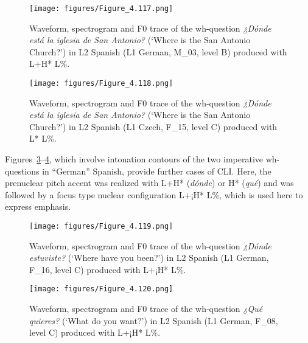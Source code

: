 \begin{figure}


\texttt{[image: figures/Figure\_4.117.png]}



\caption{Waveform, spectrogram and F0 trace of the wh-question \textit{¿Dónde está la iglesia de San Antonio?} (‘Where is the San Antonio Church?’) in L2 Spanish (L1 German, M\_03, level B) produced with L+H* L\%.}
\label{fig:4.117}
\end{figure}

\begin{figure}


\texttt{[image: figures/Figure\_4.118.png]}



\caption{Waveform, spectrogram and F0 trace of the wh-question \textit{¿Dónde está la iglesia de San Antonio?} (‘Where is the San Antonio Church?’) in L2 Spanish (L1 Czech, F\_15, level C) produced with L* L\%.}
\label{fig:4.118}
\end{figure}

Figures~\ref{fig:4.119}--\ref{fig:4.120}, which involve intonation contours of the two imperative wh-questions in “German” Spanish, provide further cases of CLI. Here, the prenuclear pitch accent was realized with L+H* (\textit{dónde}) or H* (\textit{qué}) and was followed by a focus type nuclear configuration L+¡H* L\%, which is used here to express emphasis.

\begin{figure}


\texttt{[image: figures/Figure\_4.119.png]}



\caption{Waveform, spectrogram and F0 trace of the wh-question \textit{¿Dónde estuviste?} (‘Where have you been?’) in L2 Spanish (L1 German, F\_16, level C) produced with L+¡H* L\%.}
\label{fig:4.119}
\end{figure}

\begin{figure}


\texttt{[image: figures/Figure\_4.120.png]}



\caption{Waveform, spectrogram and F0 trace of the wh-question \textit{¿Qué quieres?} (‘What do you want?’) in L2 Spanish (L1 German, F\_08, level C) produced with L+¡H* L\%.}
\label{fig:4.120}
\end{figure}

